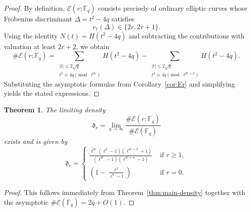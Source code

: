 \documentclass[table]{amsart}
\newtheorem{theorem}{Theorem}[section]
\newcommand{\F}{\mathbb{F}}
\numberwithin{equation}{section}
\begin{document}
\begin{proof}
By definition, $\mathcal{E}(r;\F_q)$ consists precisely of ordinary elliptic curves whose Frobenius discriminant $\Delta=t^2-4q$ satisfies
\[
v_\ell(\Delta)\in\{2r,2r+1\}.
\]
Using the identity $N(t)=H(t^2-4q)$ and subtracting the contributions with valuation at least $2r+2$, we obtain
\[
\#\mathcal{E}(r;\F_q)
=
\sum_{\substack{|t|\le 2\sqrt{q}\\ t^2\equiv 4q \!\!\!\pmod{\ell^{2r}}}}
H(t^2-4q)
-
\sum_{\substack{|t|\le 2\sqrt{q}\\ t^2\equiv 4q \!\!\!\pmod{\ell^{2r+2}}}}
H(t^2-4q).
\]
Substituting the asymptotic formulas from Corollary~\ref{cor:Er} and simplifying yields the stated expressions.
\end{proof}

\begin{theorem}\label{thm:density}
The limiting density
\[
\mathfrak{d}_r
=
\lim_{q\to\infty}\frac{\#\mathcal{E}(r;\F_q)}{\#\mathcal{E}(\F_q)}
\]
exists and is given by
\[
\mathfrak{d}_r
=
\begin{cases}\frac{\ell^{2r}(\ell^2-1)(\ell^{4r+2}+1)}
{(\ell^{4r}-1)(\ell^{4r+4}-1)}&\text{ if }r\geq 1,\\
\left(1-\frac{\ell^2}{\ell^4-1}\right)&\text{ if }r=0.
\end{cases}
\]
\end{theorem}

\begin{proof}
This follows immediately from Theorem~\ref{thm:main-density} together with the asymptotic
$\#\mathcal{E}(\F_q)=2q+O(1)$.
\end{proof}


\end{document}
